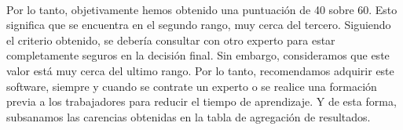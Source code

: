 \paragraph{}
Por lo tanto, objetivamente hemos obtenido una puntuación de 40 sobre 60. Esto significa que se encuentra en el segundo rango, muy cerca del tercero. Siguiendo el criterio obtenido, se debería consultar con otro experto para estar completamente seguros en la decisión final. Sin embargo, consideramos que este valor está muy cerca del ultimo rango. Por lo tanto, recomendamos adquirir este software, siempre y cuando se contrate un experto o se realice una formación previa a los trabajadores para reducir el tiempo de aprendizaje. Y de esta forma, subsanamos las carencias obtenidas en la tabla de agregación de resultados.